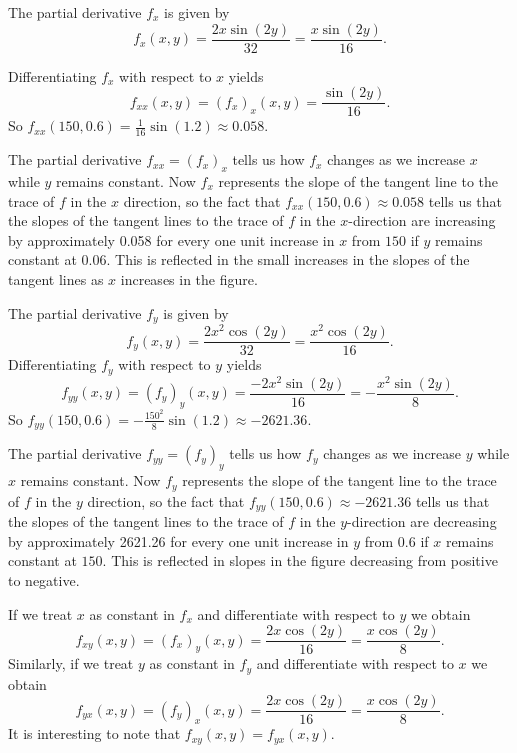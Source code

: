 \begin{activitySolution} 
  \ba
  \item The partial derivative $f_x$ is given by
    \[f_x(x,y) = \frac{2x\sin(2y)}{32} = \frac{x\sin(2y)}{16}.\]
 
  \item Differentiating $f_x$ with respect to $x$ yields
\[f_{xx}(x,y) = (f_x)_x(x,y) = \frac{\sin(2y)}{16}.\]
So $f_{xx}(150,0.6) = \frac{1}{16} \sin(1.2) \approx 0.058$. 

  \item The partial derivative $f_{xx} = (f_x)_x$ tells us how $f_x$ changes as we increase $x$ while $y$ remains constant. Now $f_x$ represents the slope of the tangent line to the trace of $f$ in the $x$ direction, so the fact that $f_{xx}(150,0.6) \approx 0.058$ tells us that the slopes of the tangent lines to the trace of $f$ in the $x$-direction are increasing by approximately 0.058 for every one unit increase in $x$ from $150$ if $y$ remains constant at $0.06$. This is reflected in the small increases in the slopes of the tangent lines as $x$ increases in the figure.  

  \item The partial derivative $f_y$ is given by
    \[f_y(x,y) = \frac{2x^2\cos(2y)}{32} = \frac{x^2\cos(2y)}{16}.\]
 Differentiating $f_y$ with respect to $y$ yields
\[f_{yy}(x,y) = (f_y)_y(x,y) = \frac{-2x^2\sin(2y)}{16} = -\frac{x^2\sin(2y)}{8}.\]
So $f_{yy}(150,0.6) = -\frac{150^2}{8} \sin(1.2) \approx -2621.36$. 


  \item The partial derivative $f_{yy} = (f_y)_y$ tells us how $f_y$ changes as we increase $y$ while $x$ remains constant. Now $f_y$ represents the slope of the tangent line to the trace of $f$ in the $y$ direction, so the fact that $f_{yy}(150,0.6) \approx -2621.36$ tells us that the slopes of the tangent lines to the trace of $f$ in the $y$-direction are decreasing by approximately 2621.26 for every one unit increase in $y$ from $0.6$ if $x$ remains constant at $150$. This is reflected in slopes in the figure decreasing from positive to negative. 

  \item If we treat $x$ as constant in $f_x$ and differentiate with respect to $y$ we obtain
\[f_{xy}(x,y) = (f_x)_y(x,y) = \frac{2x\cos(2y)}{16} = \frac{x\cos(2y)}{8}.\]
Similarly, if we treat $y$ as constant in $f_y$ and differentiate with respect to $x$ we obtain
\[f_{yx}(x,y) = (f_y)_x(x,y) = \frac{2x\cos(2y)}{16} = \frac{x\cos(2y)}{8}.\]
It is interesting to note that $f_{xy}(x,y) = f_{yx}(x,y)$. 

    \ea
\end{activitySolution}
\afterpa 